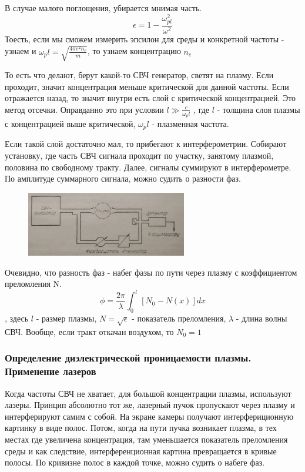 \documentclass[10pt, a4paper]{article}
\begin{document}
В случае малого поглощения, убирается мнимая часть.
\begin{equation}
	\epsilon = 1- \frac{\omega_{pl}^{2}}{\omega^{2}} 
\end{equation} 
Тоесть, если мы сможем измерить эпсилон для среды и конкретной частоты - узнаем и $\omega_pl = \sqrt{\frac{4 \pi e^{2} n_e}{m}}$, то узнаем концентрацию $n_e$

То есть что делают, берут какой-то СВЧ генератор, светят на плазму. Если проходит, значит концентрация меньше критической для данной частоты. Если отражается назад, то значит внутри есть слой с критической концентрацией. Это метод отсечки.
Оправданно это при условии $l \gg \frac{c}{\omega_pl}$
, где $l$ - толщина слоя плазмы с концентрацией выше критической, $\omega_pl$ - плазменная частота.

Если такой слой достаточно мал, то прибегают к интерферометрии. Собирают установку, где часть СВЧ сигнала проходит по участку, занятому плазмой, половина по свободному тракту. Далее, сигналы суммируют в интерферометре. По амплитуде суммарного сигнала, можно судить о разности фаз.

\begin{figure}[ht]
	\begin{center}
		\includegraphics[width=70mm]{HF interferometre.JPG}
	\end{center}
\end{figure}

 Очевидно, что разность фаз - набег фазы по пути через плазму с коэффициентом преломления N.
 \begin{equation}
 	\phi = \frac{2 \pi}{\lambda} \int_{0}^{l} [N_0 - N(x)] dx 
 \end{equation} 
, здесь $l$ - размер плазмы, $N=\sqrt{\epsilon}$ - показатель преломления, $\lambda$ - длина волны СВЧ. Вообще, если тракт откачан воздухом, то $N_0 =1$


\subsubsection{Определение диэлектрической проницаемости плазмы. Применение лазеров}

Когда частоты СВЧ не хватает, для большой концентрации плазмы, используют лазеры.
Принцип абсолютно тот же, лазерный пучок пропускают через плазму и интерферируют самим с собой. На экране камеры получают интерфериционную картинку в виде полос. Потом, когда на пути пучка возникает плазма, в тех местах где увеличена концентрация, там уменьшается показатель преломления среды и как следствие, интерференционная картина превращается в кривые полосы. По кривизне полос в каждой точке, можно судить о набеге фаз.
\end{document}
